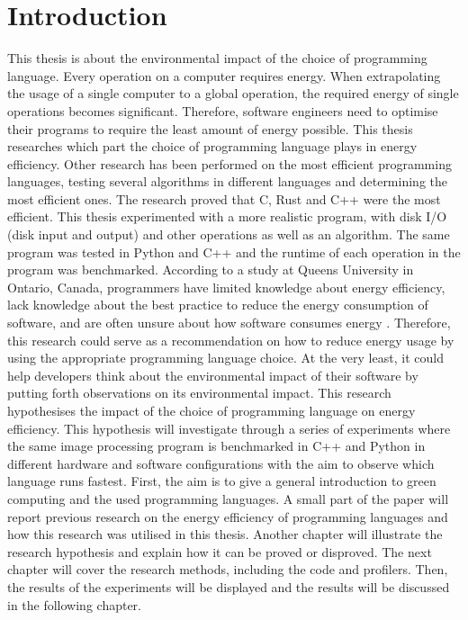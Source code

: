 \chapter{Introduction}
\setcounter{page}{1}

This thesis is about the environmental impact of the choice of programming language. Every operation on a computer requires energy. When extrapolating the usage of a single computer to a global operation, the required energy of single operations becomes significant. Therefore, software engineers need to optimise their programs to require the least amount of energy possible. This thesis researches which part the choice of programming language plays in energy efficiency.
Other research has been performed on the most efficient programming languages, testing several algorithms in different languages and determining the most efficient ones. The research proved that C, Rust and C++ were the most efficient. This thesis experimented with a more realistic program, with disk I/O (disk input and output) and other operations as well as an algorithm. The same program was tested in Python and C++ and the runtime of each operation in the program was benchmarked.
According to a study at Queens University in Ontario, Canada, programmers have limited knowledge about energy efficiency, lack knowledge about the best practice to reduce the energy consumption of software, and are often unsure about how software consumes energy \cite{programmers}.
Therefore, this research could serve as a recommendation on how to reduce energy usage by using the appropriate programming language choice. At the very least, it could help developers think about the environmental impact of their software by putting forth observations on its environmental impact.
This research hypothesises the impact of the choice of programming language on energy efficiency. This hypothesis will investigate through a series of experiments where the same image processing program is benchmarked in C++ and Python in different hardware and software configurations with the aim to observe which language runs fastest.
First, the aim is to give a general introduction to green computing and the used programming languages. A small part of the paper will report previous research on the energy efficiency of programming languages and how this research was utilised in this thesis. Another chapter will illustrate the research hypothesis and explain how it can be proved or disproved. The next chapter will cover the research methods, including the code and profilers. Then, the results of the experiments will be displayed and the results will be discussed in the following chapter.
